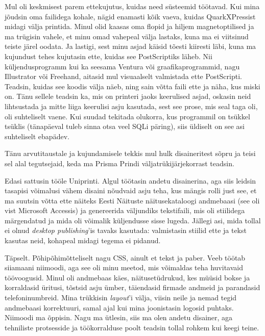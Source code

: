 Mul oli keskmisest parem ettekujutus, kuidas need süsteemid 
töötavad. Kui mina jõudsin oma failidega kohale, nägid enamasti kõik vaeva, kuidas QuarkXPressist midagi välja printida. Minul olid kaasas oma flopid ja hiljem 
magnetoptilised ja ma trügisin vahele, et 
minu omad vahepeal välja lastaks, kuna ma ei viitsinud teiste järel oodata. Ja lastigi, sest minu asjad käisid tõesti kiiresti läbi, kuna ma 
kujundust tehes kujutasin ette, kuidas see PostScriptiks läheb. Nii 
küljendusprogramm kui ka seesama Ventura või graafikaprogrammid, nagu 
Illustrator või Freehand, aitasid mul visuaalselt 
valmistada ette PostScripti. Teadsin, kuidas see koodis 
välja näeb, ning sain võtta faili ette ja näha, kus miski on. Tänu 
sellele teadsin ka, mis on printeri jaoks keerulised asjad, 
oskasin neid lihtsustada ja mitte liiga keerulisi asju kasutada, sest 
see prose, mis seal taga oli, oli suhteliselt vaene. Kui suudad 
tekitada olukorra, kus programmil on tsükkel tsüklis (tänapäeval tuleb 
sinna otsa veel SQLi päring), siis üldiselt on see asi suhteliselt ebapädev. 

Tänu arvutitaustale ja kujundamisele tekkis mul hulk disaineritest sõpru ja teisi sel alal tegutsejaid, keda ma 
Prisma Prindi väljatrükijärjekorrast teadsin. 

Edasi sattusin tööle Uniprinti. Algul töötasin andetu disainerina, aga 
siis leidsin tasapisi võimalusi vähem disaini nõudvaid asju 
teha, kus mängis rolli just see, et ma suutsin võtta ette näiteks Eesti Näituste 
näitusekataloogi andmebaasi (see oli vist Microsoft Accessis) ja 
genereerida väljundiks tekstifaili, mis oli stiilidega märgendatud ja mida 
oli võimalik küljendusse sisse lugeda. Jällegi asi, mida tollal ei olnud 
\emph{desktop publishing}'is tavaks kasutada: valmistasin 
stiilid ette ja tekst kasutas neid, kohapeal midagi tegema 
ei pidanud.


Täpselt. Põhipõhimõtteliselt nagu CSS, ainult et tekst ja paber. Veeb töötab siiamaani niimoodi, aga see oli minu meetod, mis võimaldas teha huvitavaid 
töövoogusid. Minul oli andmebaas käes, näitusetüdrukud, kes müüsid bokse ja korraldasid üritusi, tõstsid asju 
ümber, täiendasid firmade andmeid ja parandasid telefoninumbreid. Mina trükkisin \emph{layout}'i välja, viisin neile 
ja nemad tegid andmebaasi korrektuuri, samal ajal kui mina joonistasin logosid 
puhtaks. Niimoodi ma õppisin. Nagu ma ütlesin, siis ma olen andetu 
disainer, aga tehniliste protsesside ja töökorralduse poolt 
teadsin tollal rohkem kui keegi teine. 

